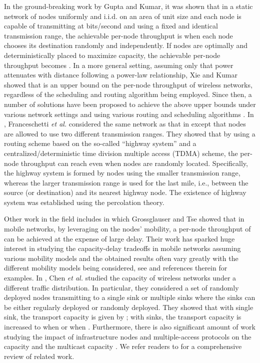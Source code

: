 \documentclass[english]{IEEEtran}
\theoremstyle{plain}
\theoremstyle{plain}
\theoremstyle{plain}
\theoremstyle{remark}
\begin{document}
In the ground-breaking work \cite{Gupta00Capacity} by Gupta and Kumar,
it was shown that in a static network of  nodes uniformly and
i.i.d. on an area of unit size and each node is capable of transmitting
at  bits/second and using a fixed and identical transmission range,
the achievable per-node throughput is 
when each node chooses its destination randomly and independently.
If nodes are optimally and deterministically placed to maximize capacity,
the achievable per-node throughput becomes .
In a more general setting, assuming only that power attenuates with
distance following a power-law relationship, Xie and Kumar \cite{Xie04A}
showed that  is an upper bound
on the per-node throughput of wireless networks, regardless of the
scheduling and routing algorithm being employed. Since then, a number
of solutions have been proposed to achieve the above upper bounds
under various network settings and using various routing and scheduling
algorithms \cite{Alfano09Capacity,Chau11Capacity,Cho06Capacity,Dousse06On,Franceschetti07Closing,Grossglauser02Mobility,Gupta00Capacity,Hu10A,Kulkarni04A,Li09Impacts,Li11The,Yang12Capacity}.
In \cite{Franceschetti07Closing}, Franceschetti \emph{et al.} considered
the same network as that in \cite{Gupta00Capacity} except that nodes
are allowed to use two different transmission ranges. They showed
that by using a routing scheme based on the so-called ``highway system''
and a centralized/deterministic time division multiple access (TDMA)
scheme, the per-node throughput can reach 
even when nodes are randomly located. Specifically, the highway system
is formed by nodes using the smaller transmission range, whereas the
larger transmission range is used for the last mile, i.e., between
the source (or destination) and its nearest highway node. The existence
of highway system was established using the percolation theory. 

Other work in the field includes \cite{Grossglauser02Mobility} in
which Grossglauser and Tse showed that in mobile networks, by leveraging
on the nodes' mobility, a per-node throughput of 
can be achieved at the expense of large delay. Their work \cite{Grossglauser02Mobility}
has sparked huge interest in studying the capacity-delay tradeoffs
in mobile networks assuming various mobility models and the obtained
results often vary greatly with the different mobility models being
considered, see \cite{Jacquet12On,Kong08Connectivity,Li09Capacity,Neely05Capacity,EI06Optimal,EI06OptimalThroughput}
and references therein for examples. In \cite{Chen09Order}, Chen
\emph{et al.} studied the capacity of wireless networks under a different
traffic distribution. In particular, they considered a set of 
randomly deployed nodes transmitting to a single sink or multiple
sinks where the sinks can be either regularly deployed or randomly
deployed. They showed that with single sink, the transport capacity
is given by ; with  sinks, the transport
capacity is increased to  when 
or  when .
Furthermore, there is also significant amount of work studying the
impact of infrastructure nodes \cite{Zemlianov05Capacity} and multiple-access
protocols \cite{Durvy09On,Alfano11New} on the capacity and the multicast
capacity \cite{Li09Multicast}. We refer readers to \cite{Haenggi09Stochastic}
for a comprehensive review of related work.
\end{document}
